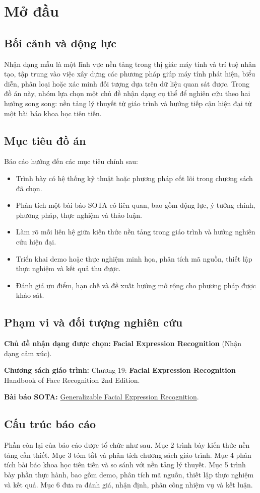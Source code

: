 \section{Mở đầu}

\subsection{Bối cảnh và động lực}
Nhận dạng mẫu là một lĩnh vực nền tảng trong thị giác máy tính và trí tuệ nhân tạo, tập trung vào việc xây dựng các phương pháp giúp máy tính phát hiện, biểu diễn, phân loại hoặc xác minh đối tượng dựa trên dữ liệu quan sát được. Trong đồ án này, nhóm lựa chọn một chủ đề nhận dạng cụ thể để nghiên cứu theo hai hướng song song: nền tảng lý thuyết từ giáo trình và hướng tiếp cận hiện đại từ một bài báo khoa học tiên tiến.

\subsection{Mục tiêu đồ án}
Báo cáo hướng đến các mục tiêu chính sau:
\begin{itemize}
    \item Trình bày có hệ thống kỹ thuật hoặc phương pháp cốt lõi trong chương sách đã chọn.
    \item Phân tích một bài báo SOTA có liên quan, bao gồm động lực, ý tưởng chính, phương pháp, thực nghiệm và thảo luận.
    \item Làm rõ mối liên hệ giữa kiến thức nền tảng trong giáo trình và hướng nghiên cứu hiện đại.
    \item Triển khai demo hoặc thực nghiệm minh họa, phân tích mã nguồn, thiết lập thực nghiệm và kết quả thu được.
    \item Đánh giá ưu điểm, hạn chế và đề xuất hướng mở rộng cho phương pháp được khảo sát.
\end{itemize}

\subsection{Phạm vi và đối tượng nghiên cứu}
\textbf{Chủ đề nhận dạng được chọn:} \textbf{Facial Expression Recognition} (Nhận dạng cảm xúc).

\textbf{Chương sách giáo trình:} Chương 19: \textbf{Facial Expression Recognition} - Handbook of Face Recognition 2nd Edition.

\textbf{Bài báo SOTA:} \href{https://eccv.ecva.net/virtual/2024/poster/718}{Generalizable Facial Expression Recognition}.

\subsection{Cấu trúc báo cáo}
Phần còn lại của báo cáo được tổ chức như sau. Mục 2 trình bày kiến thức nền tảng cần thiết. Mục 3 tóm tắt và phân tích chương sách giáo trình. Mục 4 phân tích bài báo khoa học tiên tiến và so sánh với nền tảng lý thuyết. Mục 5 trình bày phần thực hành, bao gồm demo, phân tích mã nguồn, thiết lập thực nghiệm và kết quả. Mục 6 đưa ra đánh giá, nhận định, phân công nhiệm vụ và kết luận.
